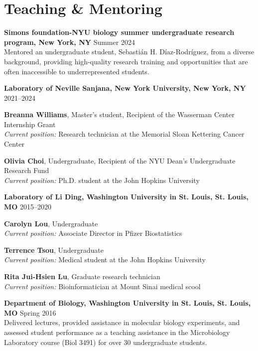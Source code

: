 \documentclass[letterpaper,11pt]{cv}
\begin{document}
\section{Teaching \& Mentoring}

\begin{entrylist}

\item \textbf{Simons foundation-NYU biology summer undergraduate research program, New York, NY} \hfill Summer 2024\\
    {\small Mentored an undergraduate student, Sebastián H. Díaz-Rodríguez, from a diverse background, providing high-quality research training and opportunities that are often inaccessible to underrepresented students.} \\

\item \textbf{Laboratory of Neville Sanjana, New York University, New York, NY} \hfill 2021--2024\\
    \begin{detaillist}
       \item \textbf{Breanna Williams}, Master's student, Recipient of the Wasserman Center Internship Grant\\
       \textit{Current position:} Research technician at the Memorial Sloan Kettering Cancer Center
       \item \textbf{Olivia Choi}, Undergraduate, Recipient of the NYU Dean's Undergraduate Research Fund \\
       \textit{Current position:} Ph.D. student at the John Hopkins University
    \end{detaillist}

\item \textbf{Laboratory of Li Ding, Washington University in St. Louis, St. Louis, MO} \hfill 2015--2020\\
    \begin{detaillist}
        \item \textbf{Carolyn Lou}, Undergraduate \\
        \textit{Current position:} Associate Director in Pfizer Biostatistics
        \item \textbf{Terrence Tsou}, Undergraduate \\
        \textit{Current position:} Medical student at the John Hopkins University
        \item \textbf{Rita Jui-Hsien Lu}, Graduate research technician \\
        \textit{Current position:} Bioinformatician at Mount Sinai medical scool

    \end{detaillist}

\item \textbf{Department of Biology, Washington University in St. Louis, St. Louis, MO} \hfill Spring 2016\\
    {\small Delivered lectures, provided assistance in molecular biology experiments, and assessed student performance as a teaching assistance in the Microbiology Laboratory course (Biol 3491) for over 30 undergraduate students.}


\end{entrylist}
\end{document}
